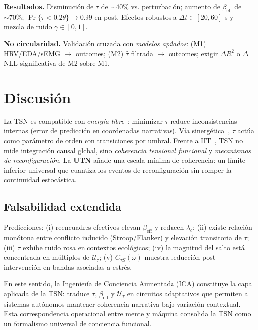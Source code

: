 \documentclass[10pt,a4paper,twocolumn]{article}
\theoremstyle{definition}
\theoremstyle{plain}
\begin{document}
\textbf{Resultados.} Disminución de \(\tau\) de \(\sim 40\%\) vs. perturbación; aumento de \(\beta_{\mathrm{eff}}\) de \(\sim 70\%\); \(\Pr\{\tau<0.2\theta\}\to 0.99\) en post. Efectos robustos a \(\Delta t\in[20,60]\) s y mezcla de ruido \(\gamma\in[0,1]\).

\textbf{No circularidad.} Validación cruzada con \emph{modelos apilados}: (M1) HRV/EDA/sEMG \(\to\) outcomes; (M2) \(\hat\tau\) filtrada \(\to\) outcomes; exigir \(\Delta R^2\) o \(\Delta\)NLL significativa de M2 sobre M1.

\section{Discusión}
La TSN es compatible con \emph{energía libre}~\cite{friston2010}: minimizar \(\tau\) reduce inconsistencias internas (error de predicción en coordenadas narrativas). Vía sinergética~\cite{haken1983,haken1983adv}, \(\tau\) actúa como parámetro de orden con transiciones por umbral. Frente a IIT~\cite{tononi2015}, TSN no mide integración causal global, sino \emph{coherencia tensional funcional} y \emph{mecanismos de reconfiguración}. La \textbf{UTN} añade una escala mínima de coherencia: un límite inferior universal que cuantiza los eventos de reconfiguración sin romper la continuidad estocástica.

\subsection{Falsabilidad extendida}
Predicciones: 
(i) reencuadres efectivos elevan \(\beta_{\mathrm{eff}}\) y reducen \(\lambda_c\); 
(ii) existe relación monótona entre conflicto inducido (Stroop/Flanker) y elevación transitoria de \(\tau\); 
(iii) \(\tau\) exhibe ruido rosa en contextos ecológicos; 
(iv) la magnitud del salto está concentrada en múltiplos de \(\mathcal{U}_\tau\); 
(v) \(C_{\tau S}(\omega)\) muestra reducción post-intervención en bandas asociadas a estrés.

En este sentido, la Ingeniería de Conciencia Aumentada (ICA) constituye la capa aplicada de la TSN: 
traduce $\tau$, $\beta_{\text{eff}}$ y $\mathcal{U}_\tau$ en circuitos adaptativos que permiten a sistemas autónomos mantener coherencia narrativa bajo variación contextual. 
Esta correspondencia operacional entre mente y máquina consolida la TSN como un formalismo universal de conciencia funcional.

\end{document}
